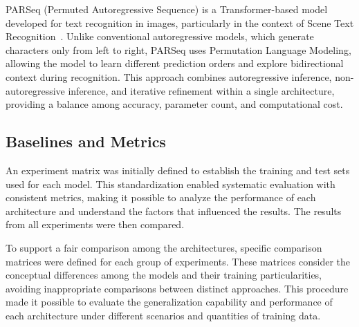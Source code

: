 \documentclass[11pt,a4paper]{article}
\begin{document}
PARSeq (Permuted Autoregressive Sequence) is a Transformer-based model developed for text recognition in images, particularly in the context of Scene Text Recognition~\cite{bautista2022parseq}. Unlike conventional autoregressive models, which generate characters only from left to right, PARSeq uses Permutation Language Modeling, allowing the model to learn different prediction orders and explore bidirectional context during recognition. This approach combines autoregressive inference, non-autoregressive inference, and iterative refinement within a single architecture, providing a balance among accuracy, parameter count, and computational cost.
\subsection{Baselines and Metrics}
\label{sec:baselines}

An experiment matrix was initially defined to establish the training and test sets used for each model. This standardization enabled systematic evaluation with consistent metrics, making it possible to analyze the performance of each architecture and understand the factors that influenced the results. The results from all experiments were then compared.

To support a fair comparison among the architectures, specific comparison matrices were defined for each group of experiments. These matrices consider the conceptual differences among the models and their training particularities, avoiding inappropriate comparisons between distinct approaches. This procedure made it possible to evaluate the generalization capability and performance of each architecture under different scenarios and quantities of training data.
\end{document}
